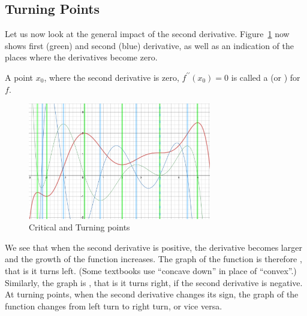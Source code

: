 \subsection{Turning Points}

Let us now look at the general impact of the second derivative.
Figure~\ref{figkurvdiss3} now shows first (green) and second (blue)
derivative, as well as an indication of the places where the derivatives
become zero.
\begin{defn}
A point $x_0$, where the second derivative is zero,
$f^{\prime\prime}(x_0)=0$ is called a  (or
) for $f$.
\end{defn}

\begin{figure}
\begin{center}
\includegraphics[width=8cm]{pic/Kurvendiskussion.pdf}
\end{center}
\caption{Critical and Turning points}
\label{figkurvdiss3}
\end{figure}
We see that when the second derivative is positive, the derivative becomes
larger and the growth of the function increases. The graph of the function
is therefore , that is it turns left.
(Some textbooks use ``concave down'' in place of ``convex''.) Similarly, the
graph is , that is it turns right, if the second derivative
is negative. 
At turning points, when the second derivative changes its sign, the graph of
the function changes from left turn to right turn, or vice versa.
\medskip

